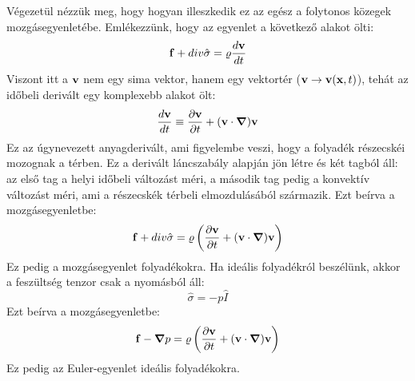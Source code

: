 \documentclass[a4paper,12pt]{article}
\begin{document}
Végezetül nézzük meg, hogy hogyan illeszkedik ez az egész a folytonos közegek mozgásegyenletébe. Emlékezzünk, hogy az egyenlet a következő alakot ölti:
\begin{equation}
    \bold{f} + div \hat{\sigma} = \varrho \frac{d \bold{v}}{dt}
\end{equation}
Viszont itt a $\bold{v}$ nem egy sima vektor, hanem egy vektortér ($\bold{v} \rightarrow \bold{v}(\bold{x}, t)$), tehát az időbeli derivált egy komplexebb alakot ölt:
\begin{equation}
    \frac{d \bold{v}}{dt} \equiv \frac{\partial \bold{v}}{\partial t} + (\bold{v} \cdot \boldsymbol{\nabla}) \bold{v}
\end{equation}
Ez az úgynevezett anyagderivált, ami figyelembe veszi, hogy a folyadék részecskéi mozognak a térben. Ez a derivált láncszabály alapján jön létre és két tagból áll: az első tag a helyi időbeli változást méri,
a második tag pedig a konvektív változást méri, ami a részecskék térbeli elmozdulásából származik. Ezt beírva a mozgásegyenletbe:
\begin{equation}
    \bold{f} + div \hat{\sigma} = \varrho \left(\frac{\partial \bold{v}}{\partial t} + (\bold{v} \cdot \boldsymbol{\nabla}) \bold{v}\right)
\end{equation}
Ez pedig a mozgásegyenlet folyadékokra. Ha ideális folyadékról beszélünk, akkor a feszültség tenzor csak a nyomásból áll:
\begin{equation}
    \hat{\sigma} = - p \hat{I}
\end{equation}
Ezt beírva a mozgásegyenletbe:
\begin{equation}
    \bold{f} - \boldsymbol{\nabla} p = \varrho \left(\frac{\partial \bold{v}}{\partial t} + (\bold{v} \cdot \boldsymbol{\nabla}) \bold{v}\right)
\end{equation}
Ez pedig az Euler-egyenlet ideális folyadékokra.
\end{document}
